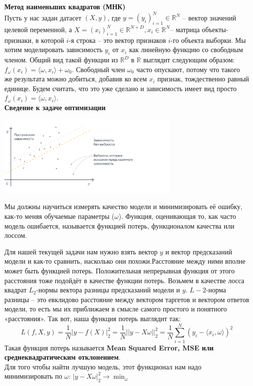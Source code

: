 {\large \textbf{Метод наименьших квадратов (МНК)}} \\
Пусть у нас задан датасет $(X, y)$, где 
$y=(y_i)_{i=1}^N \in \mathbb{R}^{N}$ – вектор значений целевой переменной, а $X=(x_i)_{i=1}^N \in \mathbb{R}^{N+D}, x_i \in \mathbb{R}^{N}$– матрица объекты-признаки, в которой 
$i$-я строка – это вектор признаков 
$i$-го объекта выборки. Мы хотим моделировать зависимость $y_i$ от $x_i$ как линейную функцию со свободным членом. Общий вид такой функции из $\mathbb{R}^D$ в $\mathbb{R}$ выглядит следующим образом: $ f_{\omega}(x_i)=\langle\omega,x_i\rangle+\omega_0$.
Свободный член $\omega_0$ часто опускают, потому что такого же результата можно добиться, добавив ко всем $x_i$ признак, тождественно равный единице. Будем считать, что это уже сделано и зависимость имеет вид просто $f_\omega(x_i)=\langle\omega,x_i\rangle$. \\
\textbf{Сведение к задаче оптимизации} \\
\begin{center}
    \includegraphics[height=4cm]{pics/t_osn24_2.png}
\end{center}
Мы должны научиться измерять качество модели и минимизировать её ошибку, как-то меняя обучаемые параметры ($\omega$). Функция, оценивающая то, как часто модель ошибается, называется функцией потерь, функционалом качества или лоссом.

Для нашей текущей задачи нам нужно взять вектор $y$ и вектор предсказаний модели и как-то сравнить, насколько они похожи.Расстояние между ними вполне может быть функцией потерь. Положительная непрерывная функция от этого расстояния тоже подойдёт в качестве функции потерь. Возьмем в качестве лосса квадрат $L_2$-нормы вектора разницы предсказаний модели и $y$. $L-2$-норма разницы – это евклидово расстояние между вектором таргетов и вектором ответов модели, то есть мы их приближаем в смысле самого простого и понятного «расстояния».
Так вот, наша функция потерь выглядит так:
\begin{equation*}
    L(f,X,y)=\frac{1}{N}|y-f(X)|_2^2=\frac{1}{N}||y-X\omega||_2^2 =\frac{1}{N}\sum_{i=1}^{N} (y_i-\langle x_i,\omega\rangle)^2
\end{equation*}
Такая функция потерь называется \textbf{Mean Squared Error, MSE или среднеквадратическим отклонением}. \\
Для того чтобы найти лучшую модель, этот функционал нам надо минимизировать по $\omega$: $|y-X\omega|_2^2 \xrightarrow{} \min_{\omega}$

